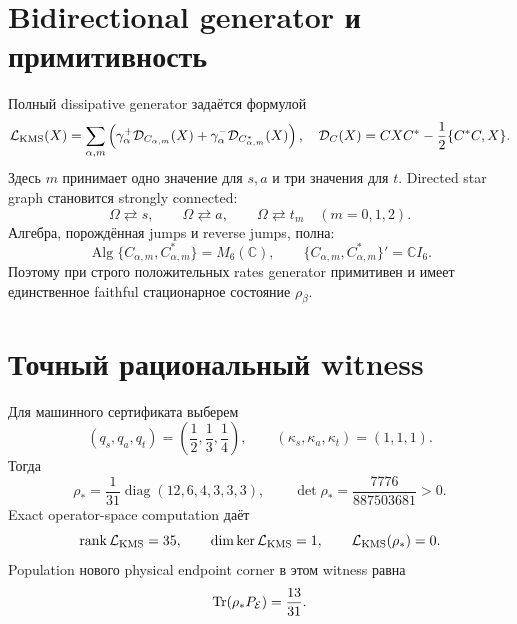 \section{Bidirectional generator и примитивность}

Полный dissipative generator задаётся формулой
\begin{equation}
 \mathcal L_{\rm KMS}(X)=
 \sum_{\alpha,m}\left(
 \gamma_\alpha^+\mathcal D_{C_{\alpha,m}}(X)
 +\gamma_\alpha^-\mathcal D_{C_{\alpha,m}^*}(X)\right),
 \quad
 \mathcal D_C(X)=CXC^*-\frac12\{C^*C,X\}.
 \label{eq:v9-kms-completion-generator}
\end{equation}
Здесь $m$ принимает одно значение для $s,a$ и три значения для $t$.
Directed star graph становится strongly connected:
\begin{equation}
 \Omega\rightleftarrows s,
 \qquad \Omega\rightleftarrows a,
 \qquad \Omega\rightleftarrows t_m\quad(m=0,1,2).
 \label{eq:v9-kms-completion-star-graph}
\end{equation}
Алгебра, порождённая jumps и reverse jumps, полна:
\begin{equation}
 \operatorname{Alg}\{C_{\alpha,m},C_{\alpha,m}^*\}=M_6(\mathbb C),
 \qquad
 \{C_{\alpha,m},C_{\alpha,m}^*\}'=\mathbb C I_6.
 \label{eq:v9-kms-completion-full-algebra}
\end{equation}
Поэтому при строго положительных rates generator примитивен и имеет
единственное faithful стационарное состояние $\rho_\beta$.

\section{Точный рациональный witness}

Для машинного сертификата выберем
\begin{equation}
 (q_s,q_a,q_t)=\left(\frac12,\frac13,\frac14\right),
 \qquad (\kappa_s,\kappa_a,\kappa_t)=(1,1,1).
 \label{eq:v9-kms-completion-rational-parameters}
\end{equation}
Тогда
\begin{equation}
 \rho_*=\frac1{31}\operatorname{diag}(12,6,4,3,3,3),
 \qquad \det\rho_*=\frac{7776}{887503681}>0.
 \label{eq:v9-kms-completion-rational-state}
\end{equation}
Exact operator-space computation даёт
\begin{equation}
 \operatorname{rank}\mathcal L_{\rm KMS}=35,
 \qquad \dim\ker\mathcal L_{\rm KMS}=1,
 \qquad \mathcal L_{\rm KMS}(\rho_*)=0.
 \label{eq:v9-kms-completion-rank}
\end{equation}
Population нового physical endpoint corner в этом witness равна
\begin{equation}
 \operatorname{Tr}(\rho_*P_{\mathcal E})=\frac{13}{31}.
 \label{eq:v9-kms-completion-endpoint-population}
\end{equation}

